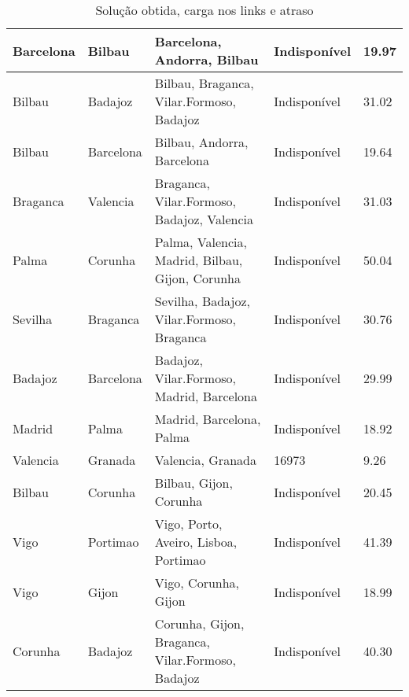\begin{table}[!htb]
{\begin{tabular}{|l|l|l|l|l|}
Barcelona & Bilbau & Barcelona, Andorra, Bilbau & Indisponível & 19.97 \\ \hline
Bilbau & Badajoz & Bilbau, Braganca, Vilar.Formoso, Badajoz & Indisponível & 31.02 \\ \hline
Bilbau & Barcelona & Bilbau, Andorra, Barcelona & Indisponível & 19.64 \\ \hline
Braganca & Valencia & Braganca, Vilar.Formoso, Badajoz, Valencia & Indisponível & 31.03 \\ \hline
Palma & Corunha & Palma, Valencia, Madrid, Bilbau, Gijon, Corunha & Indisponível & 50.04 \\ \hline
Sevilha & Braganca & Sevilha, Badajoz, Vilar.Formoso, Braganca & Indisponível & 30.76 \\ \hline
Badajoz & Barcelona & Badajoz, Vilar.Formoso, Madrid, Barcelona & Indisponível & 29.99 \\ \hline
Madrid & Palma & Madrid, Barcelona, Palma & Indisponível & 18.92 \\ \hline
Valencia & Granada & Valencia, Granada & 16973 & 9.26 \\ \hline
Bilbau & Corunha & Bilbau, Gijon, Corunha & Indisponível & 20.45 \\ \hline
Vigo & Portimao & Vigo, Porto, Aveiro, Lisboa, Portimao & Indisponível & 41.39 \\ \hline
Vigo & Gijon & Vigo, Corunha, Gijon & Indisponível & 18.99 \\ \hline
Corunha & Badajoz & Corunha, Gijon, Braganca, Vilar.Formoso, Badajoz & Indisponível & 40.30 \\ \hline
\end{tabular}}
\caption[]{Solução obtida, carga nos links e atraso}
\end{table}

